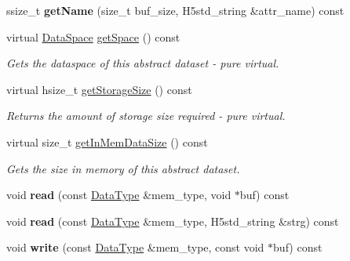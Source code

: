 \begin{DoxyCompactItemize}
ssize\+\_\+t {\bfseries get\+Name} (size\+\_\+t buf\+\_\+size, H5std\+\_\+string \&attr\+\_\+name) const
\item 
\mbox{\label{class_h5_1_1_attribute_a479ef820dff6212478b8480e15795def}} 
virtual \hyperlink{class_h5_1_1_data_space}{Data\+Space} \hyperlink{class_h5_1_1_attribute_a479ef820dff6212478b8480e15795def}{get\+Space} () const
\begin{DoxyCompactList}\small\item\em Gets the dataspace of this abstract dataset -\/ pure virtual. \end{DoxyCompactList}\item 
\mbox{\label{class_h5_1_1_attribute_a4000e34b9f71960431c1739093f15a42}} 
virtual hsize\+\_\+t \hyperlink{class_h5_1_1_attribute_a4000e34b9f71960431c1739093f15a42}{get\+Storage\+Size} () const
\begin{DoxyCompactList}\small\item\em Returns the amount of storage size required -\/ pure virtual. \end{DoxyCompactList}\item 
\mbox{\label{class_h5_1_1_attribute_ae344096e631c00ac0552c5046872fc06}} 
virtual size\+\_\+t \hyperlink{class_h5_1_1_attribute_ae344096e631c00ac0552c5046872fc06}{get\+In\+Mem\+Data\+Size} () const
\begin{DoxyCompactList}\small\item\em Gets the size in memory of this abstract dataset. \end{DoxyCompactList}\item 
\mbox{\label{class_h5_1_1_attribute_a18b3466d2b725c15ac941daee88019bf}} 
void {\bfseries read} (const \hyperlink{class_h5_1_1_data_type}{Data\+Type} \&mem\+\_\+type, void $\ast$buf) const
\item 
\mbox{\label{class_h5_1_1_attribute_aed73095cbbee90b1861cf61402e57289}} 
void {\bfseries read} (const \hyperlink{class_h5_1_1_data_type}{Data\+Type} \&mem\+\_\+type, H5std\+\_\+string \&strg) const
\item 
\mbox{\label{class_h5_1_1_attribute_a8b294b320537b0d77b89be8d8266133e}} 
void {\bfseries write} (const \hyperlink{class_h5_1_1_data_type}{Data\+Type} \&mem\+\_\+type, const void $\ast$buf) const

\end{DoxyCompactItemize}

